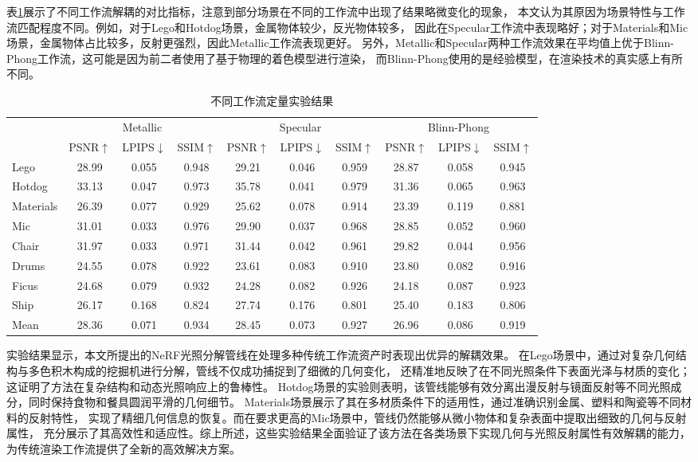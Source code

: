 表\ref{tab:rendering_comparison}展示了不同工作流解耦的对比指标，注意到部分场景在不同的工作流中出现了结果略微变化的现象，
本文认为其原因为场景特性与工作流匹配程度不同。例如，对于Lego和Hotdog场景，金属物体较少，反光物体较多，
因此在Specular工作流中表现略好；对于Materials和Mic场景，金属物体占比较多，反射更强烈，因此Metallic工作流表现更好。
另外，Metallic和Specular两种工作流效果在平均值上优于Blinn-Phong工作流，这可能是因为前二者使用了基于物理的着色模型进行渲染，
而Blinn-Phong使用的是经验模型，在渲染技术的真实感上有所不同。
\begin{table}[h]
  \centering
  \caption{不同工作流定量实验结果}
  \begin{tabular}{l ccc ccc ccc}
      \toprule
      & \multicolumn{3}{c}{Metallic} & \multicolumn{3}{c}{Specular} & \multicolumn{3}{c}{Blinn-Phong} \\
      \cmidrule(lr){2-4} \cmidrule(lr){5-7} \cmidrule(lr){8-10}
      & PSNR$\uparrow$ & LPIPS$\downarrow$ & SSIM$\uparrow$ & PSNR$\uparrow$ & LPIPS$\downarrow$ & SSIM$\uparrow$ & PSNR$\uparrow$ & LPIPS$\downarrow$ & SSIM$\uparrow$ \\
      \midrule
      Lego & 28.99 & 0.055 & 0.948 & 29.21 & 0.046 & 0.959 & 28.87 & 0.058 & 0.945 \\
      Hotdog & 33.13 & 0.047 & 0.973 & 35.78 & 0.041 & 0.979 & 31.36 & 0.065 & 0.963 \\
      Materials & 26.39 & 0.077 & 0.929 & 25.62 & 0.078 & 0.914 & 23.39 & 0.119 & 0.881 \\
      Mic & 31.01 & 0.033 & 0.976 & 29.90 & 0.037 & 0.968 & 28.85 & 0.052 & 0.960 \\
      Chair & 31.97 & 0.033 & 0.971 & 31.44 & 0.042 & 0.961 & 29.82 & 0.044 & 0.956 \\
      Drums & 24.55 & 0.078 & 0.922 & 23.61 & 0.083 & 0.910 & 23.80 & 0.082 & 0.916 \\
      Ficus & 24.68 & 0.079 & 0.932 & 24.28 & 0.082 & 0.926 & 24.18 & 0.087 & 0.923 \\
      Ship & 26.17 & 0.168 & 0.824 & 27.74 & 0.176 & 0.801 & 25.40 & 0.183 & 0.806 \\
      \midrule
      Mean & 28.36 & 0.071 & 0.934 & 28.45 & 0.073 & 0.927 & 26.96 & 0.086 & 0.919 \\
      \bottomrule
  \end{tabular}
  \label{tab:rendering_comparison}
\end{table}

实验结果显示，本文所提出的NeRF光照分解管线在处理多种传统工作流资产时表现出优异的解耦效果。
在Lego场景中，通过对复杂几何结构与多色积木构成的挖掘机进行分解，管线不仅成功捕捉到了细微的几何变化，
还精准地反映了在不同光照条件下表面光泽与材质的变化；这证明了方法在复杂结构和动态光照响应上的鲁棒性。
Hotdog场景的实验则表明，该管线能够有效分离出漫反射与镜面反射等不同光照成分，同时保持食物和餐具圆润平滑的几何细节。
Materials场景展示了其在多材质条件下的适用性，通过准确识别金属、塑料和陶瓷等不同材料的反射特性，
实现了精细几何信息的恢复。而在要求更高的Mic场景中，管线仍然能够从微小物体和复杂表面中提取出细致的几何与反射属性，
充分展示了其高效性和适应性。综上所述，这些实验结果全面验证了该方法在各类场景下实现几何与光照反射属性有效解耦的能力，
为传统渲染工作流提供了全新的高效解决方案。

